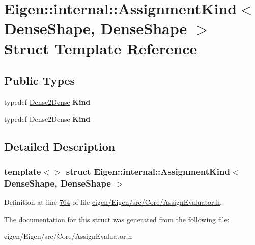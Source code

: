 \hypertarget{struct_eigen_1_1internal_1_1_assignment_kind_3_01_dense_shape_00_01_dense_shape_01_4}{}\section{Eigen\+:\+:internal\+:\+:Assignment\+Kind$<$ Dense\+Shape, Dense\+Shape $>$ Struct Template Reference}
\label{struct_eigen_1_1internal_1_1_assignment_kind_3_01_dense_shape_00_01_dense_shape_01_4}
\subsection*{Public Types}
\begin{DoxyCompactItemize}
\item 
\mbox{\label{struct_eigen_1_1internal_1_1_assignment_kind_3_01_dense_shape_00_01_dense_shape_01_4_a83f22c796a459812a94e5d3b5de66891}} 
typedef \hyperlink{struct_eigen_1_1internal_1_1_dense2_dense}{Dense2\+Dense} {\bfseries Kind}
\item 
\mbox{\label{struct_eigen_1_1internal_1_1_assignment_kind_3_01_dense_shape_00_01_dense_shape_01_4_a83f22c796a459812a94e5d3b5de66891}} 
typedef \hyperlink{struct_eigen_1_1internal_1_1_dense2_dense}{Dense2\+Dense} {\bfseries Kind}
\end{DoxyCompactItemize}


\subsection{Detailed Description}
\subsubsection*{template$<$$>$\newline
struct Eigen\+::internal\+::\+Assignment\+Kind$<$ Dense\+Shape, Dense\+Shape $>$}



Definition at line \hyperlink{eigen_2_eigen_2src_2_core_2_assign_evaluator_8h_source_l00764}{764} of file \hyperlink{eigen_2_eigen_2src_2_core_2_assign_evaluator_8h_source}{eigen/\+Eigen/src/\+Core/\+Assign\+Evaluator.\+h}.



The documentation for this struct was generated from the following file\+:\begin{DoxyCompactItemize}
\item 
eigen/\+Eigen/src/\+Core/\+Assign\+Evaluator.\+h\end{DoxyCompactItemize}
